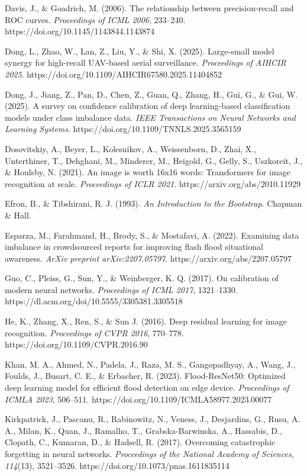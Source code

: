 \documentclass[
  11pt,
]{article}
\begin{document}
Davis, J., \& Goadrich, M. (2006). The relationship between
precision-recall and ROC curves. \emph{Proceedings of ICML 2006},
233--240. https://doi.org/10.1145/1143844.1143874

Dong, L., Zhao, W., Lan, Z., Liu, Y., \& Shi, X. (2025). Large-small
model synergy for high-recall UAV-based aerial surveillance.
\emph{Proceedings of AIHCIR 2025}.
https://doi.org/10.1109/AIHCIR67580.2025.11404852

Dong, J., Jiang, Z., Pan, D., Chen, Z., Guan, Q., Zhang, H., Gui, G., \&
Gui, W. (2025). A survey on confidence calibration of deep
learning-based classification models under class imbalance data.
\emph{IEEE Transactions on Neural Networks and Learning Systems}.
https://doi.org/10.1109/TNNLS.2025.3565159

Dosovitskiy, A., Beyer, L., Kolesnikov, A., Weissenborn, D., Zhai, X.,
Unterthiner, T., Dehghani, M., Minderer, M., Heigold, G., Gelly, S.,
Uszkoreit, J., \& Houlsby, N. (2021). An image is worth 16x16 words:
Transformers for image recognition at scale. \emph{Proceedings of ICLR
2021}. https://arxiv.org/abs/2010.11929

Efron, B., \& Tibshirani, R. J. (1993). \emph{An Introduction to the
Bootstrap}. Chapman \& Hall.

Esparza, M., Farahmand, H., Brody, S., \& Mostafavi, A. (2022).
Examining data imbalance in crowdsourced reports for improving flash
flood situational awareness. \emph{ArXiv preprint arXiv:2207.05797}.
https://arxiv.org/abs/2207.05797

Guo, C., Pleiss, G., Sun, Y., \& Weinberger, K. Q. (2017). On
calibration of modern neural networks. \emph{Proceedings of ICML 2017},
1321--1330. https://dl.acm.org/doi/10.5555/3305381.3305518

He, K., Zhang, X., Ren, S., \& Sun J. (2016). Deep residual learning for
image recognition. \emph{Proceedings of CVPR 2016}, 770--778.
https://doi.org/10.1109/CVPR.2016.90

Khan, M. A., Ahmed, N., Padela, J., Raza, M. S., Gangopadhyay, A., Wang,
J., Foulds, J., Busart, C. E., \& Erbacher, R. (2023). Flood-ResNet50:
Optimized deep learning model for efficient flood detection on edge
device. \emph{Proceedings of ICMLA 2023}, 506--511.
https://doi.org/10.1109/ICMLA58977.2023.00077

Kirkpatrick, J., Pascanu, R., Rabinowitz, N., Veness, J., Desjardins,
G., Rusu, A. A., Milan, K., Quan, J., Ramalho, T., Grabska-Barwinska,
A., Hassabis, D., Clopath, C., Kumaran, D., \& Hadsell, R. (2017).
Overcoming catastrophic forgetting in neural networks. \emph{Proceedings
of the National Academy of Sciences}, \emph{114}(13), 3521--3526.
https://doi.org/10.1073/pnas.1611835114
\end{document}
